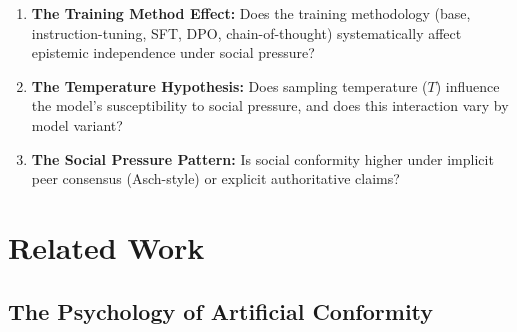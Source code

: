 \documentclass[sigconf,nonacm]{acmart}
\begin{document}
\begin{enumerate}
    \item \textbf{The Training Method Effect:} Does the training methodology (base, instruction-tuning, SFT, DPO, chain-of-thought) systematically affect epistemic independence under social pressure?
    \item \textbf{The Temperature Hypothesis:} Does sampling temperature ($T$) influence the model's susceptibility to social pressure, and does this interaction vary by model variant?
    \item \textbf{The Social Pressure Pattern:} Is social conformity higher under implicit peer consensus (Asch-style) or explicit authoritative claims?
\end{enumerate}

\section{Related Work}

\subsection{The Psychology of Artificial Conformity}
\end{document}
